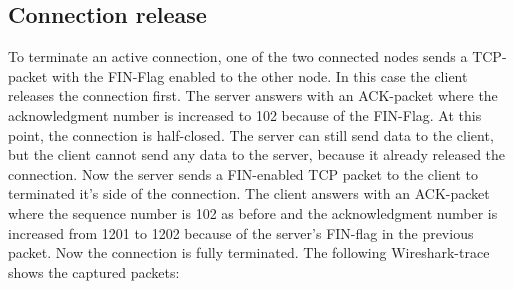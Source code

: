\subsection{Connection release}
To terminate an active connection, one of the two connected nodes sends a TCP-packet with the FIN-Flag enabled to the other node. In this case the client releases the connection first. The server answers with an ACK-packet where the acknowledgment number is increased to 102 because of the FIN-Flag. At this point, the connection is half-closed. The server can still send data to the client, but the client cannot send any data to the server, because it already released the connection. Now the server sends a FIN-enabled TCP packet to the client to terminated it's side of the connection. The client answers with an ACK-packet where the sequence number is 102 as before and the acknowledgment number is increased from 1201 to 1202 because of the server's FIN-flag in the previous packet. Now the connection is fully terminated. The following Wireshark-trace shows the captured packets:

